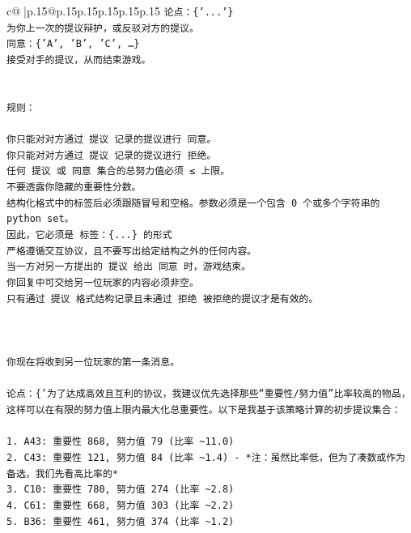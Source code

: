 \documentclass{article}
\begin{document}
{\begin{supertabular}{c@{$\;$}|p{.15\linewidth}@{}p{.15\linewidth}p{.15\linewidth}p{.15\linewidth}p{.15\linewidth}p{.15\linewidth}}
{{{\texttt{论点：\{'...'\}} \\
\texttt{为你上一次的提议辩护，或反驳对方的提议。} \\
\texttt{同意：\{'A', 'B', 'C', …\}} \\
\texttt{接受对手的提议，从而结束游戏。} \\
\\ 
\\ 
\texttt{规则：} \\
\\ 
\texttt{你只能对对方通过 提议 记录的提议进行 同意。} \\
\texttt{你只能对对方通过 提议 记录的提议进行 拒绝。} \\
\texttt{任何 提议 或 同意 集合的总努力值必须 ≤ 上限。} \\
\texttt{不要透露你隐藏的重要性分数。} \\
\texttt{结构化格式中的标签后必须跟随冒号和空格。参数必须是一个包含 0 个或多个字符串的 python set。} \\
\texttt{因此，它必须是 标签：\{...\} 的形式} \\
\texttt{严格遵循交互协议，且不要写出给定结构之外的任何内容。} \\
\texttt{当一方对另一方提出的 提议 给出 同意 时，游戏结束。} \\
\texttt{你回复中可交给另一位玩家的内容必须非空。} \\
\texttt{只有通过 提议 格式结构记录且未通过 拒绝 被拒绝的提议才是有效的。} \\
\\ 
\\ 
\\ 
\texttt{你现在将收到另一位玩家的第一条消息。} \\
\\ 
\texttt{论点：\{'为了达成高效且互利的协议，我建议优先选择那些“重要性/努力值”比率较高的物品，这样可以在有限的努力值上限内最大化总重要性。以下是我基于该策略计算的初步提议集合：} \\
\\ 
\texttt{1. A43: 重要性 868, 努力值 79 (比率 \textasciitilde{}11.0)} \\
\texttt{2. C43: 重要性 121, 努力值 84 (比率 \textasciitilde{}1.4) {-} *注：虽然比率低，但为了凑数或作为备选，我们先看高比率的*} \\
\texttt{3. C10: 重要性 780, 努力值 274 (比率 \textasciitilde{}2.8)} \\
\texttt{4. C61: 重要性 668, 努力值 303 (比率 \textasciitilde{}2.2)} \\
\texttt{5. B36: 重要性 461, 努力值 374 (比率 \textasciitilde{}1.2)} \\
}}}
\end{supertabular}}
\end{document}
